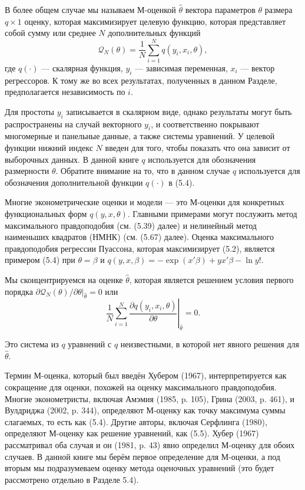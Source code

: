 В более общем случае мы называем М-оценкой $\hat{\theta}$ вектора параметров $\theta$ размера $q \times 1$ оценку, которая максимизирует целевую функцию, которая представляет собой сумму или среднее $N$ дополнительных функций
\begin{equation}
\mathcal{Q}_N(\theta)= \frac{1}{N} \sum_{i=1}^{N} q(y_i,x_i,\theta),
\end{equation}
где $q(\cdot)$ --- скалярная функция, $y_i$ --- зависимая переменная, $x_i$ --- вектор регрессоров. К тому же во всех результатах, полученных в данном Разделе, предполагается независимость по $i$.

Для простоты $y_i$ записывается в скалярном виде, однако результаты могут быть распространены на случай векторного $y_i$, и соответственно покрывают многомерные и панельные данные, а также системы уравнений. У целевой функции нижний индекс $N$ введен для того, чтобы показать что она зависит от выборочных данных. В данной книге $q$ используется для обозначения размерности $\theta$. Обратите внимание на то, что в данном случае $q$ используется для обозначения дополнительной функции $q(\cdot)$ в (5.4).

Многие эконометрические оценки и модели --- это М-оценки для конкретных функциональных форм $q(y,x,\theta)$. Главными примерами могут послужить метод максимального правдоподобия (см. (5.39) далее) и нелинейный метод наименьших квадратов (НМНК) (см. (5.67) далее). Оценка максимального правдоподобия регрессии Пуассона, которая максимизирует (5.2), является примером (5.4) при $\theta=\beta$ и $q(y,x,\beta)=-\exp(x'\beta)+y x' \beta - \ln y!$.

Мы сконцентрируемся на оценке $\hat{\theta}$, которая является решением условия первого порядка  
$ \partial \mathcal{Q}_N(\theta) / \partial \theta |_{\hat{\theta}} = 0$ или
\begin{equation}
\left. \frac{1}{N} \sum_{i=1}^{N} \frac{\partial q(y_i,x_i,\theta)}{\partial \theta} \right|_{\hat{\theta}}=0.
\end{equation}

Это система из $q$ уравнений с $q$ неизвестными, в которой нет явного решения для $\hat{\theta}$.

Термин М-оценка, который был введён Хубером (1967), интерпретируется как сокращение для оценки, похожей на оценку максимального правдоподобия. Многие эконометристы, включая Амэмия (1985, p. 105), Грина (2003, p. 461), и Вулдриджа (2002, p. 344), определяют М-оценку как точку максимума суммы слагаемых, то есть как (5.4). Другие авторы, включая Серфлинга (1980), определяют М-оценку как решение уравнений, как (5.5). Хубер (1967) рассматривал оба случая и он (1981, p. 43) явно определил М-оценку для обоих случаев. В данной книге мы берём первое определение для М-оценки, а под вторым мы подразумеваем оценку метода оценочных уравнений (это будет рассмотрено отдельно в Разделе 5.4).

